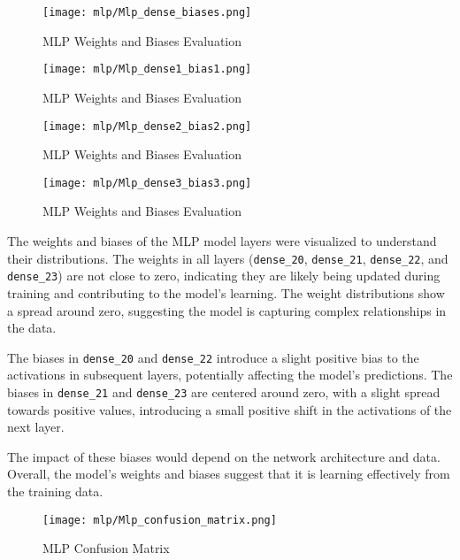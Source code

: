 \begin{figure}[H] 
  \centering
  \texttt{[image: mlp/Mlp\_dense\_biases.png]}
  \caption{MLP Weights and Biases Evaluation}\label{fig:mlp_weights_biases}
\end{figure}

\begin{figure}[H] 
  \centering
  \texttt{[image: mlp/Mlp\_dense1\_bias1.png]}
  \caption{MLP Weights and Biases Evaluation}\label{fig:dense1_bias1}
\end{figure}

\begin{figure}[H] 
  \centering
  \texttt{[image: mlp/Mlp\_dense2\_bias2.png]}
  \caption{MLP Weights and Biases Evaluation}\label{fig:dense2_bias2}
\end{figure}

\begin{figure}[H] 
  \centering
  \texttt{[image: mlp/Mlp\_dense3\_bias3.png]}
  \caption{MLP Weights and Biases Evaluation}\label{fig:dense3_bias3}
\end{figure}

The weights and biases of the MLP model layers were visualized to understand their distributions. The weights in all layers (\texttt{dense\_20}, \texttt{dense\_21}, \texttt{dense\_22}, and \texttt{dense\_23}) are not close to zero, indicating they are likely being updated during training and contributing to the model’s learning. The weight distributions show a spread around zero, suggesting the model is capturing complex relationships in the data.

The biases in \texttt{dense\_20} and \texttt{dense\_22} introduce a slight positive bias to the activations in subsequent layers, potentially affecting the model’s predictions. The biases in \texttt{dense\_21} and \texttt{dense\_23} are centered around zero, with a slight spread towards positive values, introducing a small positive shift in the activations of the next layer.

The impact of these biases would depend on the network architecture and data. Overall, the model’s weights and biases suggest that it is learning effectively from the training data.


\begin{figure}[H] 
  \centering
  \texttt{[image: mlp/Mlp\_confusion\_matrix.png]}
  \caption{MLP Confusion Matrix}\label{fig:mpl_confusion_matrix}
\end{figure}

